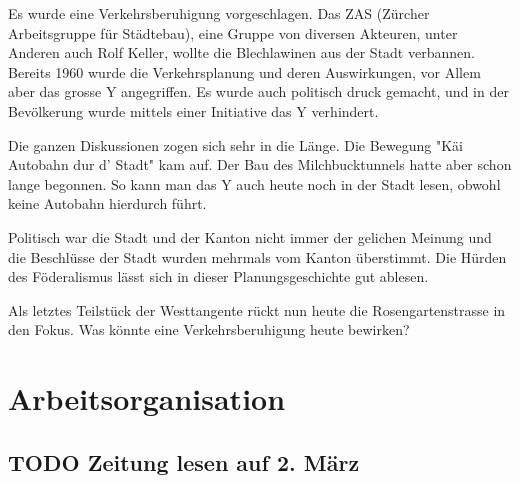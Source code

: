 \documentclass[a4paper,11pt,ngerman]{article}
\begin{document}
Es wurde eine Verkehrsberuhigung vorgeschlagen. Das ZAS (Zürcher
Arbeitsgruppe für Städtebau), eine Gruppe von diversen Akteuren, unter
Anderen auch Rolf Keller, wollte die Blechlawinen aus der Stadt
verbannen. Bereits 1960 wurde die Verkehrsplanung und deren Auswirkungen,
vor Allem aber das grosse Y angegriffen. Es wurde auch politisch druck
gemacht, und in der Bevölkerung wurde mittels einer Initiative das Y
verhindert.

Die ganzen Diskussionen zogen sich sehr in die Länge. Die Bewegung "Käi
Autobahn dur d' Stadt" kam auf. Der Bau des Milchbucktunnels hatte aber
schon lange begonnen. So kann man das Y auch heute noch in der Stadt lesen,
obwohl keine Autobahn hierdurch führt.

Politisch war die Stadt und der Kanton nicht immer der gelichen Meinung und
die Beschlüsse der Stadt wurden mehrmals vom Kanton überstimmt. Die Hürden
des Föderalismus lässt sich in dieser Planungsgeschichte gut ablesen.

Als letztes Teilstück der Westtangente rückt nun heute die
Rosengartenstrasse in den Fokus. Was könnte eine Verkehrsberuhigung heute
bewirken?

\section{Arbeitsorganisation}
\label{sec-3}

\subsection{{\bfseries\sffamily TODO} Zeitung lesen auf 2. März}
\label{sec-3-1}
\end{document}
